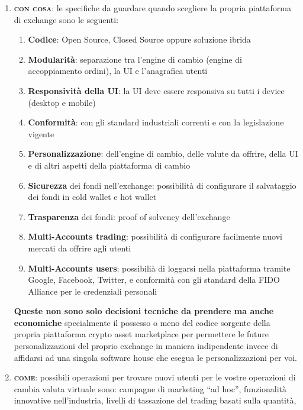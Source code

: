 \documentclass[11pt,fleqn]{book} %
\begin{document}
\begin{enumerate}
\begin{tcbraster}[raster columns=3,raster rows=2,raster height=5cm,
		valign=center, halign=center,
		enhanced,size=small,sharp corners,colframe=silver,coltext=black,
		colback=silver,fit algorithm=hybrid* ]
	\end{tcbraster}	

	\item \textbf{\textsc{con cosa}}: le specifiche da guardare quando scegliere la propria piattaforma di exchange sono le seguenti: 
		\begin{enumerate}[label*=\arabic*.]
			\item \textbf{Codice}: Open Source, Closed Source oppure soluzione ibrida
			\item \textbf{Modularità}: separazione tra l'engine di cambio (engine di accoppiamento ordini), la UI e l'anagrafica utenti
			\item \textbf{Responsività della UI}: la UI deve essere responsiva su tutti i device (desktop e mobile)
			\item \textbf{Conformità}: con gli standard industriali correnti e con la legislazione vigente
			\item \textbf{Personalizzazione}: dell'engine di cambio, delle valute da offrire, della UI e di altri aspetti della piattaforma di cambio
			\item \textbf{Sicurezza} dei fondi nell'exchange: possibilità di configurare il salvataggio dei fondi in cold wallet e hot wallet
			\item \textbf{Trasparenza} dei fondi: proof of solvency dell'exchange
			\item \textbf{Multi-Accounts trading}: possibilità di configurare facilmente nuovi mercati da offrire agli utenti
			\item \textbf{Multi-Accounts users}: possibilià di loggarsi nella piattaforma tramite Google, Facebook, Twitter, e conformità
			con gli standard della FIDO Alliance per le credenziali personali
		\end{enumerate}	
	\textbf{Queste non sono solo decisioni tecniche da prendere ma anche economiche} specialmente il possesso o meno del codice sorgente della propria 
	piattaforma	crypto asset marketplace per permettere le future personalizzazioni del proprio exchange in maniera indipendente invece di affidarsi
	ad una singola software house che esegua le personalizzazioni per voi.
	\item \textbf{\textsc{come}}: possibili operazioni per trovare nuovi utenti per le vostre operazioni di cambia valuta virtuale sono:
	campagne di marketing ``ad hoc'', funzionalità innovative nell'industria, livelli di tassazione del trading basati sulla quantità, 

\end{enumerate}
\end{document}
